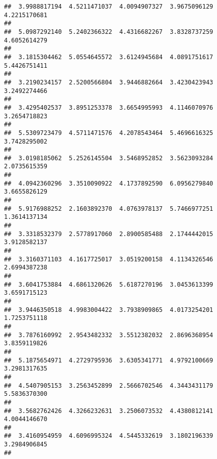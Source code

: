 \documentclass[]{article}
\begin{document}
\begin{verbatim}
##  3.9988817194  4.5211471037  4.0094907327  3.9675096129  4.2215170681 
##                                                                       
##  5.0987292140  5.2402366322  4.4316682267  3.8328737259  4.6052614279 
##                                                                       
##  3.1815304462  5.0554645572  3.6124945684  4.0891751617  5.4426751411 
##                                                                       
##  3.2190234157  2.5200566804  3.9446882664  3.4230423943  3.2492274466 
##                                                                       
##  3.4295402537  3.8951253378  3.6654995993  4.1146070976  3.2654718823 
##                                                                       
##  5.5309723479  4.5711471576  4.2078543464  5.4696616325  3.7428295002 
##                                                                       
##  3.0198185062  5.2526145504  3.5468952852  3.5623093284  2.0735615359 
##                                                                       
##  4.0942360296  3.3510090922  4.1737892590  6.0956279840  3.6655826129 
##                                                                       
##  5.9176988252  2.1603892370  4.0763978137  5.7466977251  1.3614137134 
##                                                                       
##  3.3318532379  2.5778917060  2.8900585488  2.1744442015  3.9128582137 
##                                                                       
##  3.3160371103  4.1617725017  3.0519200158  4.1134326546  2.6994387238 
##                                                                       
##  3.6041753884  4.6861320626  5.6187270196  3.0453613399  3.6591715123 
##                                                                       
##  3.9446350518  4.9983004422  3.7938909865  4.0173254201  1.7253751118 
##                                                                       
##  3.7876160992  2.9543482332  3.5512382032  2.8696368954  3.8359119826 
##                                                                       
##  5.1875654971  4.2729795936  3.6305341771  4.9792100669  3.2981317635 
##                                                                       
##  4.5407905153  3.2563452899  2.5666702546  4.3443431179  5.5836370300 
##                                                                       
##  3.5682762426  4.3266232631  3.2506073532  4.4380812141  4.0044146670 
##                                                                       
##  3.4160954959  4.6096995324  4.5445332619  3.1802196339  3.2984906845 
##                                                                       

\end{verbatim}
\end{document}
